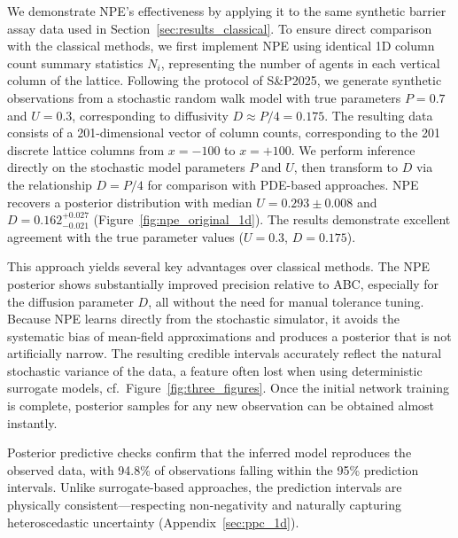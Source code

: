 \documentclass{article}
\newcommand{\SP}{S\&P2025}
\begin{document}
We demonstrate NPE's effectiveness by applying it to the same synthetic barrier assay data used in Section~\ref{sec:results_classical}. To ensure direct comparison with the classical methods, we first implement NPE using identical 1D column count summary statistics $N_i$, representing the number of agents in each vertical column of the lattice. Following the protocol of \SP, we generate synthetic observations from a stochastic random walk model with true parameters $P = 0.7$ and $U = 0.3$, corresponding to diffusivity $D \approx P/4 = 0.175$. The resulting data consists of a 201-dimensional vector of column counts, corresponding to the 201 discrete lattice columns from $x=-100$ to $x=+100$. We perform inference directly on the stochastic model parameters $P$ and $U$, then transform to $D$ via the relationship $D = P/4$ for comparison with PDE-based approaches. NPE recovers a posterior distribution with median $U = 0.293 \pm 0.008$ and $D=0.162^{+0.027}_{-0.021}$ (Figure~\ref{fig:npe_original_1d}). The results demonstrate excellent agreement with the true parameter values ($U = 0.3$, $D = 0.175$).

This approach yields several key advantages over classical methods. The NPE posterior shows substantially improved precision relative to ABC, especially for the diffusion parameter $D$, all without the need for manual tolerance tuning. Because NPE learns directly from the stochastic simulator, it avoids the systematic bias of mean-field approximations and produces a posterior that is not artificially narrow. The resulting credible intervals accurately reflect the natural stochastic variance of the data, a feature often lost when using deterministic surrogate models, cf.\ Figure~\ref{fig:three_figures}. Once the initial network training is complete, posterior samples for any new observation can be obtained almost instantly.

Posterior predictive checks confirm that the inferred model reproduces the observed data, with 94.8\% of observations falling within the 95\% prediction intervals. Unlike surrogate-based approaches, the prediction intervals are physically consistent---respecting non-negativity and naturally capturing heteroscedastic uncertainty (Appendix~\ref{sec:ppc_1d}).
\end{document}
